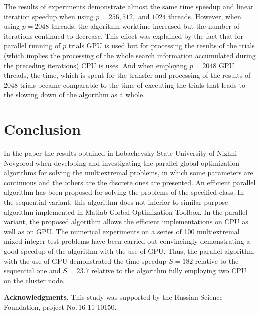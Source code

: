 \documentclass{llncs}
\begin{document}
The results of experiments demonstrate almost the same time speedup and linear iteration 
speedup when using $p=256, 512,$ and $1024$ threads. However, when using $p=2048$ 
threads, the algorithm worktime increased but the number of iterations continued to decrease. 
This effect was explained by the fact that for parallel running of $p$ trials GPU is used but for 
processing the results of the trials (which implies the processing of the whole search information 
accumulated during the preceding iterations) CPU is uses. And when employing $p=2048$ 
GPU threads, the time, which is spent for the transfer and processing of the results of 2048 
trials became comparable to the time of executing the trials that leads to the slowing down of 
the algorithm as a whole.


\section{Conclusion}
In the paper the results obtained in Lobachevsky State University of Nizhni Novgorod 
when developing and investigating the parallel global optimization algorithms for solving the 
multiextremal problems, in which some parameters are continuous and the others are the discrete 
ones are presented. 
An efficient parallel algorithm has been proposed for solving the problems of the specified class. 
In the sequential variant, this algorithm does not inferior to similar purpose algorithm 
implemented in Matlab Global Optimization Toolbox.
In the parallel variant, the proposed algorithm allows the efficient implementations on CPU as 
well as on GPU. 
The numerical experiments on a series of 100 multiextremal mixed-integer test problems have been carried out 
convincingly demonstrating a good speedup of the algorithm with the use of GPU.
Thus, the parallel algorithm with the use of GPU demonstrated the time speedup $S = 182$ 
relative to the sequential one and $S = 23.7$ relative to the algorithm fully employing two CPU on 
the cluster node.

\medskip

\textbf{Acknowledgments}. This study was supported by the Russian Science Foundation, project No.\,16-11-10150.
\end{document}
